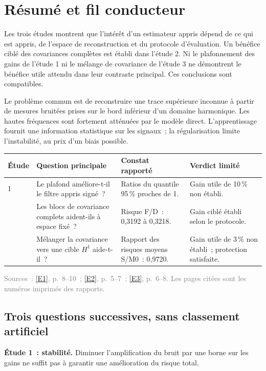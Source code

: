 \documentclass[11pt,a4paper]{article}
\newcommand{\src}[1]{\textcolor{graytext}{\footnotesize #1}}
\DeclareRobustCommand{\eref}[1]{\hyperlink{ref#1}{[#1]}}
\begin{document}
\section{Résumé et fil conducteur}
\begin{keybox}
Les trois études montrent que l'intérêt d'un estimateur appris dépend de ce qui est appris,
de l'espace de reconstruction et du protocole d'évaluation. Un bénéfice ciblé des covariances
complètes est établi dans l'étude 2. Ni le plafonnement des gains de l'étude 1 ni le mélange
de covariance de l'étude 3 ne démontrent le bénéfice utile attendu dans leur contraste principal.
Ces conclusions sont compatibles.
\end{keybox}

Le problème commun est de reconstruire une trace supérieure inconnue à partir de mesures
bruitées prises sur le bord inférieur d'un domaine harmonique. Les hautes fréquences sont
fortement atténuées par le modèle direct. L'apprentissage fournit une information statistique
sur les signaux~; la régularisation limite l'instabilité, au prix d'un biais possible.

\begin{tabularx}{\textwidth}{@{}p{}YYY@{}}
\toprule
\textbf{Étude} & \textbf{Question principale} & \textbf{Constat rapporté} & \textbf{Verdict limité}\\
 & Le plafond améliore-t-il le filtre appris signé~? & Ratios du quantile 95\,\% proches de 1. & Gain utile de 10\,\% non établi.\\
 & Les blocs de covariance complets aident-ils à espace fixé~? & Risque F/D~: 0,3192 à 0,3218. & Gain ciblé établi selon le protocole.\\
 & Mélanger la covariance vers une cible $H^1$ aide-t-il~? & Rapport des risques moyens S/M0~: 0,9720. & Gain utile de 3\,\% non établi~; protection satisfaite.\\
\bottomrule
\end{tabularx}
\src{Sources~: \eref{E1}, p.~8--10~; \eref{E2}, p.~5--7~; \eref{E3}, p.~6--8. Les pages citées sont les numéros imprimés des rapports.}

\subsection*{Trois questions successives, sans classement artificiel}
\textbf{Étude 1~: stabilité.} Diminuer l'amplification du bruit par une borne sur les gains
ne suffit pas à garantir une amélioration du risque total.
\end{document}
